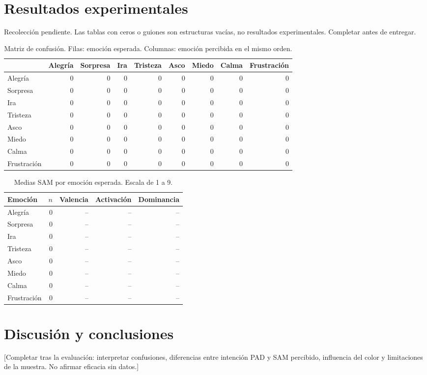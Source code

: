 \documentclass[conference]{IEEEtran}
\begin{document}
\section{Resultados experimentales}
Recolección pendiente. Las tablas con ceros o guiones son estructuras vacías, no resultados experimentales. Completar antes de entregar.
\begin{table}[t]
\centering\scriptsize
\caption{Matriz de confusión. Filas: emoción esperada. Columnas: emoción percibida en el mismo orden.}
\begin{tabular}{lrrrrrrrr}\toprule
 & Alegría & Sorpresa & Ira & Tristeza & Asco & Miedo & Calma & Frustración \\\midrule
Alegría & 0 & 0 & 0 & 0 & 0 & 0 & 0 & 0 \\
Sorpresa & 0 & 0 & 0 & 0 & 0 & 0 & 0 & 0 \\
Ira & 0 & 0 & 0 & 0 & 0 & 0 & 0 & 0 \\
Tristeza & 0 & 0 & 0 & 0 & 0 & 0 & 0 & 0 \\
Asco & 0 & 0 & 0 & 0 & 0 & 0 & 0 & 0 \\
Miedo & 0 & 0 & 0 & 0 & 0 & 0 & 0 & 0 \\
Calma & 0 & 0 & 0 & 0 & 0 & 0 & 0 & 0 \\
Frustración & 0 & 0 & 0 & 0 & 0 & 0 & 0 & 0 \\
\bottomrule\end{tabular}\end{table}
\begin{table}[t]\centering\small
\caption{Medias SAM por emoción esperada. Escala de 1 a 9.}
\begin{tabular}{lrrrr}\toprule
Emoción & $n$ & Valencia & Activación & Dominancia \\\midrule
Alegría & 0 & -- & -- & -- \\
Sorpresa & 0 & -- & -- & -- \\
Ira & 0 & -- & -- & -- \\
Tristeza & 0 & -- & -- & -- \\
Asco & 0 & -- & -- & -- \\
Miedo & 0 & -- & -- & -- \\
Calma & 0 & -- & -- & -- \\
Frustración & 0 & -- & -- & -- \\
\bottomrule\end{tabular}\end{table}
\section{Discusión y conclusiones}
[Completar tras la evaluación: interpretar confusiones, diferencias entre intención PAD y SAM percibido, influencia del color y limitaciones de la muestra. No afirmar eficacia sin datos.]
\end{document}
